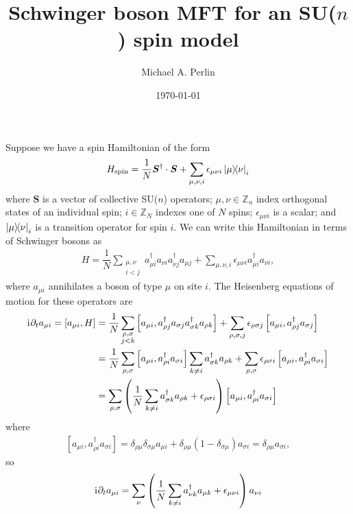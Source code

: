 \documentclass[nofootinbib,notitlepage,11pt]{revtex4-2}
\renewcommand{\t}{\text} %
\newcommand{\f}[2]{\dfrac{#1}{#2}} %
\newcommand{\p}[1]{\left(#1\right)} %
\renewcommand{\sp}[1]{\left[#1\right]} %
\renewcommand{\v}{\bm} %
\renewcommand{\c}{\cdot} %
\renewcommand{\d}{\partial} %
\renewcommand{\i}{\mathrm{i}\mkern1mu} %
\newcommand{\1}{\mathds{1}}
\newcommand{\ZZ}{\mathbb{Z}}
\begin{document}
\thispagestyle{fancy}

\title{Schwinger boson MFT for an SU($n$) spin model}%
\author{Michael A. Perlin}%
\date{\today}

\maketitle

Suppose we have a spin Hamiltonian of the form
\begin{align}
  H_{\t{spin}} = \f1N \v S^\dag\c\v S
  + \sum_{\mu,\nu,i} \epsilon_{\mu\nu i} \op{\mu}{\nu}_i
\end{align}
where $\v S$ is a vector of collective SU($n$) operators;
$\mu,\nu\in\ZZ_n$ index orthogonal states of an individual spin;
$i\in\ZZ_N$ indexes one of $N$ spins; $\epsilon_{\mu\nu i}$ is a
scalar; and $\op{\mu}{\nu}_i$ is a transition operator for spin $i$.
We can write this Hamiltonian in terms of Schwinger bosons as
\begin{align}
  H = \f1N \sum_{\substack{\mu,\nu\\i<j}}
  a_{\mu i}^\dag a_{\nu i} a_{\nu j}^\dag a_{\mu j}
  + \sum_{\mu,\nu,i} \epsilon_{\mu\nu i} a_{\mu i}^\dag a_{\nu i},
\end{align}
where $a_{\mu i}$ annihilates a boson of type $\mu$ on site $i$.  The
Heisenberg equations of motion for these operators are
\begin{align}
  \i \d_t a_{\mu i}
  = \sp{a_{\mu i},H}
  &= \f1N \sum_{\substack{\rho,\sigma\\j<k}}
  \sp{a_{\mu i}, a_{\rho j}^\dag a_{\sigma j}
    a_{\sigma k}^\dag a_{\rho k}}
  + \sum_{\rho,\sigma,j} \epsilon_{\rho\sigma j}
  \sp{a_{\mu i}, a_{\rho j}^\dag a_{\sigma j}} \\
  &= \f1N \sum_{\rho,\sigma}
  \sp{a_{\mu i}, a_{\rho i}^\dag a_{\sigma i}} \sum_{k\ne i}
  a_{\sigma k}^\dag a_{\rho k}
  + \sum_{\rho,\sigma} \epsilon_{\rho\sigma i}
  \sp{a_{\mu i}, a_{\rho i}^\dag a_{\sigma i}} \\
  &= \sum_{\rho,\sigma}
  \p{\f1N \sum_{k\ne i} a_{\sigma k}^\dag a_{\rho k}
    + \epsilon_{\rho\sigma i}}
  \sp{a_{\mu i}, a_{\rho i}^\dag a_{\sigma i}}
\end{align}
where
\begin{align}
  \sp{a_{\mu i}, a_{\rho i}^\dag a_{\sigma i}}
  = \delta_{\rho\mu} \delta_{\sigma\mu} a_{\mu i}
  + \delta_{\rho\mu} \p{1-\delta_{\sigma\mu}} a_{\sigma i}
  = \delta_{\rho\mu} a_{\sigma i},
\end{align}
so
\begin{align}
  \i \d_t a_{\mu i}
  = \sum_\nu \p{\f1N \sum_{k\ne i} a_{\nu k}^\dag a_{\mu k}
    + \epsilon_{\mu\nu i}} a_{\nu i}
\end{align}


\end{document}
